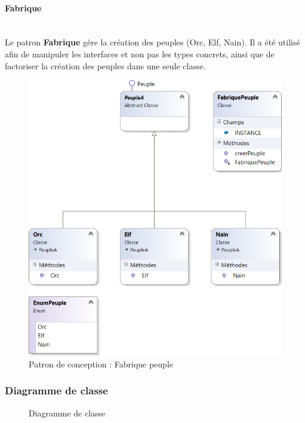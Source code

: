 \documentclass[a4paper,11pt]{article}
\begin{document}
\paragraph{Fabrique}\mbox{}\medskip\\
Le patron \textbf{Fabrique} gère la création des peuples (Orc, Elf, Nain). Il a été utilisé afin de manipuler les interfaces et non pas les types concrets, ainsi que de factoriser la création des peuples dans une seule classe.
\begin{figure}[H]
	\centering
	\includegraphics[width=\textwidth]{fig/fabrique_peuple}
	\caption{Patron de conception : Fabrique peuple}
	\label{pc:fp}
\end{figure}

\subsubsection{Diagramme de classe}
\begin{figure}[H]
	\centering
	\caption{Diagramme de classe}
	\label{dc}
\end{figure}
\end{document}
